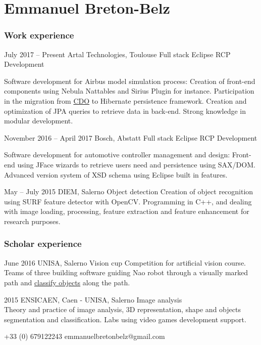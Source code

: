 \documentclass{tccv-master/tccv}
\begin{document}
\part{Emmanuel Breton-Belz}

\section{Work experience}

\begin{eventlist}

\item{July 2017 -- Present}
     {Artal Technologies, Toulouse}
     {Full stack Eclipse RCP Development}

Software development for Airbus model simulation process: Creation of 
front-end components using Nebula Nattables and Sirius Plugin for instance.
Participation in the migration from \href{https://www.eclipse.org/cdo/}{CDO} to Hibernate
persistence framework. Creation and optimization of JPA queries to retrieve 
data in back-end. Strong knowledge in modular development.

\item{November 2016 -- April 2017}
     {Bosch, Abstatt}
     {Full stack Eclipse RCP Development}

Software development for automotive controller management and design:
Front-end using JFace wizards to retrieve users need and persistence using 
SAX/DOM. Advanced version system of XSD schema using Eclipse built in
features.

\item{May -- July 2015}
     {DIEM, Salerno}
     {Object detection}
Creation of object recognition using SURF feature detector with OpenCV.
Programming in C++, and dealing with image loading, processing, feature extraction
and feature enhancement for research purposes.

\end{eventlist}

\section{Scholar experience}

\begin{eventlist}
\item{June 2016}
{UNISA, Salerno}
     {Vision cup}
Competition for artificial vision course. Teams of three building software guiding 
Nao robot through a visually marked path and \href{https://github.com/manumanmax/Nao}{classify objects} along the path.

\item{2015}
{ENSICAEN, Caen - UNISA, Salerno}
     {Image analysis} \\
Theory and practice of image analysis, 3D representation, shape and objects segmentation and classification.
Labs using video games development support. 

\end{eventlist}
    {+33 (0) 679122243}
    {emmanuelbretonbelz@gmail.com}
\end{document}

